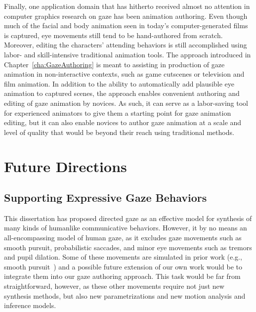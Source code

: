 Finally, one application domain that has hitherto received almost no attention in computer graphics research on gaze has been animation authoring. Even though much of the facial and body animation seen in today's computer-generated films is captured, eye movements still tend to be hand-authored from scratch. Moreover, editing the characters' attending behaviors is still accomplished using labor- and skill-intensive traditional animation tools. The approach introduced in Chapter~\ref{cha:GazeAuthoring} is meant to assisting in production of gaze animation in non-interactive contexts, such as game cutscenes or television and film animation. In addition to the ability to automatically add plausible eye animation to captured scenes, the approach enables convenient authoring and editing of gaze animation by novices. As such, it can serve as a labor-saving tool for experienced animators to give them a starting point for gaze animation editing, but it can also enable novices to author gaze animation at a scale and level of quality that would be beyond their reach using traditional methods.

\section{Future Directions}

\subsection{Supporting Expressive Gaze Behaviors}

This dissertation has proposed directed gaze as an effective model for synthesis of many kinds of humanlike communicative behaviors. However, it by no means an all-encompassing model of human gaze, as it excludes gaze movements such as smooth pursuit, probabilistic saccades, and minor eye movements such as tremors and pupil dilation. Some of these movements are simulated in prior work (e.g., smooth pursuit~\citep{yeo2012eyecatch}) and a possible future extension of our own work would be to integrate them into our gaze authoring approach. This task would be far from straightforward, however, as these other movements require not just new synthesis methods, but also new parametrizations and new motion analysis and inference models.

